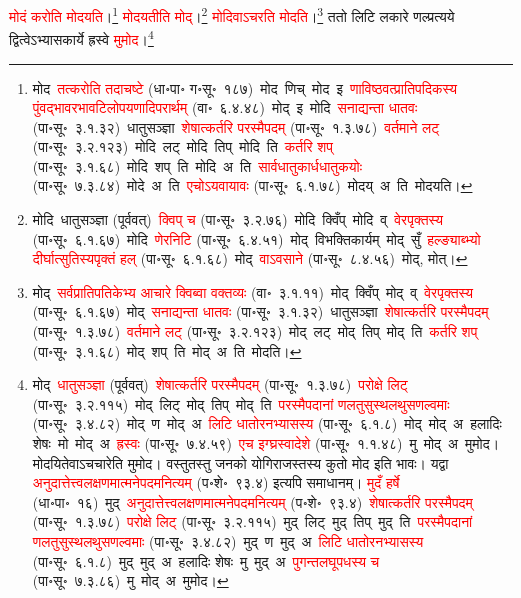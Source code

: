 \begin{sloppypar}
\textcolor{red}{मोदं करोति मोदयति}।\footnote{मोद~\arrow \textcolor{red}{तत्करोति तदाचष्टे} (धा॰पा॰ ग॰सू॰~१८७)~\arrow मोद~णिच्~\arrow मोद~इ~\arrow \textcolor{red}{णाविष्ठवत्प्राति\-पदिकस्य पुंवद्भाव\-रभाव\-टिलोप\-यणादि\-परार्थम्} (वा॰~६.४.४८)~\arrow मोद्~इ~\arrow मोदि~\arrow \textcolor{red}{सनाद्यन्ता धातवः} (पा॰सू॰~३.१.३२)~\arrow धातुसञ्ज्ञा~\arrow \textcolor{red}{शेषात्कर्तरि परस्मैपदम्} (पा॰सू॰~१.३.७८)~\arrow \textcolor{red}{वर्तमाने लट्} (पा॰सू॰~३.२.१२३)~\arrow मोदि~लट्~\arrow मोदि~तिप्~\arrow मोदि~ति~\arrow \textcolor{red}{कर्तरि शप्‌} (पा॰सू॰~३.१.६८)~\arrow मोदि~शप्~ति~\arrow मोदि~अ~ति~\arrow \textcolor{red}{सार्वधातुकार्धधातुकयोः} (पा॰सू॰~७.३.८४)~\arrow मोदे~अ~ति~\arrow \textcolor{red}{एचोऽयवायावः} (पा॰सू॰~६.१.७८)~\arrow मोदय्~अ~ति~\arrow मोदयति।} \textcolor{red}{मोदयतीति मोद्}।\footnote{मोदि~\arrow धातुसञ्ज्ञा (पूर्ववत्)~\arrow \textcolor{red}{क्विप् च} (पा॰सू॰~३.२.७६)~\arrow मोदि~क्विँप्~\arrow मोदि~व्~\arrow \textcolor{red}{वेरपृक्तस्य} (पा॰सू॰~६.१.६७)~\arrow मोदि~\arrow \textcolor{red}{णेरनिटि} (पा॰सू॰~६.४.५१)~\arrow मोद्~\arrow विभक्तिकार्यम्~\arrow मोद्~सुँ~\arrow \textcolor{red}{हल्ङ्याब्भ्यो दीर्घात्सुतिस्यपृक्तं हल्} (पा॰सू॰~६.१.६८)~\arrow मोद्~\arrow \textcolor{red}{वाऽवसाने} (पा॰सू॰~८.४.५६)~\arrow मोद्, मोत्।} \textcolor{red}{मोदिवाऽचरति मोदति}।\footnote{मोद्~\arrow \textcolor{red}{सर्वप्रातिपतिकेभ्य आचारे क्विब्वा वक्तव्यः} (वा॰~३.१.११)~\arrow मोद्~क्विँप्~\arrow मोद्~व्~\arrow \textcolor{red}{वेरपृक्तस्य} (पा॰सू॰~६.१.६७)~\arrow मोद्~\arrow \textcolor{red}{सनाद्यन्ता धातवः} (पा॰सू॰~३.१.३२)~\arrow धातु\-सञ्ज्ञा~\arrow \textcolor{red}{शेषात्कर्तरि परस्मैपदम्} (पा॰सू॰~१.३.७८)~\arrow \textcolor{red}{वर्तमाने लट्} (पा॰सू॰~३.२.१२३)~\arrow मोद्~लट्~\arrow मोद्~तिप्~\arrow मोद्~ति~\arrow \textcolor{red}{कर्तरि शप्‌} (पा॰सू॰~३.१.६८)~\arrow मोद्~शप्~ति~\arrow मोद्~अ~ति~\arrow मोदति।} ततो लिटि लकारे णल्प्रत्यये द्वित्वेऽभ्यास\-कार्ये ह्रस्वे \textcolor{red}{मुमोद}।\footnote{मोद्~\arrow \textcolor{red}{धातु\-सञ्ज्ञा} (पूर्ववत्)~\arrow \textcolor{red}{शेषात्कर्तरि परस्मैपदम्} (पा॰सू॰~१.३.७८)~\arrow \textcolor{red}{परोक्षे लिट्} (पा॰सू॰~३.२.११५)~\arrow मोद्~लिट्~\arrow मोद्~तिप्~\arrow मोद्~ति~\arrow \textcolor{red}{परस्मैपदानां णलतुसुस्थलथुस\-णल्वमाः} (पा॰सू॰~३.४.८२)~\arrow मोद्~ण~\arrow मोद्~अ~\arrow \textcolor{red}{लिटि धातोरनभ्यासस्य} (पा॰सू॰~६.१.८)~\arrow मोद्~मोद्~अ~\arrow हलादिः शेषः~\arrow मो~मोद्~अ~\arrow \textcolor{red}{ह्रस्वः} (पा॰सू॰~७.४.५९)~\arrow \textcolor{red}{एच इग्घ्रस्वादेशे} (पा॰सू॰~१.१.४८)~\arrow मु~मोद्~अ~\arrow मुमोद। मोदयितेवाऽचचारेति मुमोद। वस्तुतस्तु जनको योगिराजस्तस्य कुतो मोद इति भावः। यद्वा \textcolor{red}{अनुदात्तेत्त्व\-लक्षणमात्मने\-पदमनित्यम्} (प॰शे॰~९३.४) इत्यपि समाधानम्। \textcolor{red}{मुदँ हर्षे} (धा॰पा॰~१६)~\arrow मुद्~\arrow \textcolor{red}{अनुदात्तेत्त्व\-लक्षणमात्मने\-पदमनित्यम्} (प॰शे॰~९३.४)~\arrow \textcolor{red}{शेषात्कर्तरि परस्मैपदम्} (पा॰सू॰~१.३.७८)~\arrow \textcolor{red}{परोक्षे लिट्} (पा॰सू॰~३.२.११५)~\arrow मुद्~लिट्~\arrow मुद्~तिप्~\arrow मुद्~ति~\arrow \textcolor{red}{परस्मैपदानां णलतुसुस्थलथुस\-णल्वमाः} (पा॰सू॰~३.४.८२)~\arrow मुद्~ण~\arrow मुद्~अ~\arrow \textcolor{red}{लिटि धातोरनभ्यासस्य} (पा॰सू॰~६.१.८)~\arrow मुद्~मुद्~अ~\arrow हलादिः शेषः~\arrow मु~मुद्~अ~\arrow \textcolor{red}{पुगन्त\-लघूपधस्य च} (पा॰सू॰~७.३.८६)~\arrow मु~मोद्~अ~\arrow मुमोद।}\end{sloppypar}

